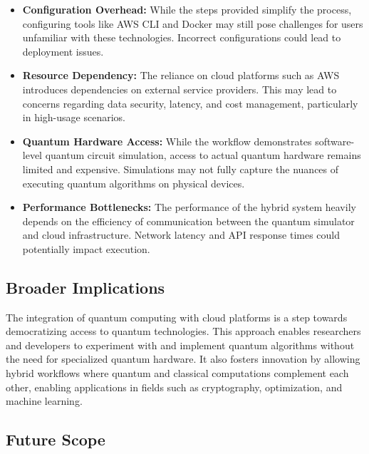 \documentclass[conference]{IEEEtran}
\begin{document}
\begin{itemize}
    \item \textbf{Configuration Overhead:} While the steps provided simplify the process, configuring tools like AWS CLI and Docker may still pose challenges for users unfamiliar with these technologies. Incorrect configurations could lead to deployment issues.

    \item \textbf{Resource Dependency:} The reliance on cloud platforms such as AWS introduces dependencies on external service providers. This may lead to concerns regarding data security, latency, and cost management, particularly in high-usage scenarios.

    \item \textbf{Quantum Hardware Access:} While the workflow demonstrates software-level quantum circuit simulation, access to actual quantum hardware remains limited and expensive. Simulations may not fully capture the nuances of executing quantum algorithms on physical devices.

    \item \textbf{Performance Bottlenecks:} The performance of the hybrid system heavily depends on the efficiency of communication between the quantum simulator and cloud infrastructure. Network latency and API response times could potentially impact execution.
\end{itemize}

\subsection{Broader Implications}

The integration of quantum computing with cloud platforms is a step towards democratizing access to quantum technologies. This approach enables researchers and developers to experiment with and implement quantum algorithms without the need for specialized quantum hardware. It also fosters innovation by allowing hybrid workflows where quantum and classical computations complement each other, enabling applications in fields such as cryptography, optimization, and machine learning.

\subsection{Future Scope}
\end{document}
